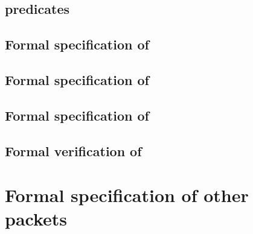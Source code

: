 \subsection{\acsl predicates }

\subsection{Formal specification of }

\subsection{Formal specification of }

\subsection{Formal specification of }

\subsection{Formal verification of }

\section{Formal specification of other packets}

